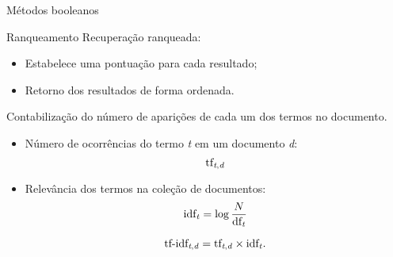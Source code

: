 \documentclass[%
  10pt,%
  aspectratio = 169,%
  compress,%
  t,%
]{beamer}%
\begin{document}
    \begin{frame}[fragile = singleslide]{}{Métodos booleanos}
        
    \end{frame}
    
    \begin{frame}[fragile = singleslide]{}{Ranqueamento}
        Recuperação ranqueada:
        \begin{itemize}
            \item Estabelece uma pontuação para cada resultado;
            \item Retorno dos resultados de forma ordenada.
        \end{itemize}
    
        Contabilização do número de aparições de cada um dos termos no documento.
        \begin{itemize}
            \item Número de ocorrências do termo \textit{t} em um documento \textit{d}:
            \begin{equation}\label{eq:tf-td}
                \text{tf}_{\text{\textit{t},\textit{d}}}
            \end{equation}
            \item Relevância dos termos na coleção de documentos:
            \begin{equation}
                \label{eq:inverse-document-frequency}
                \text{idf}_{\text{\textit{t}}} = \log{\frac{N}{\text{df}_{\text{\textit{t}}}}}
            \end{equation}
            
            \begin{equation}
                \label{eq:tf-idf}
                \text{tf-idf}_{\text{\textit{t},\textit{d}}}  = \text{tf}_{\text{\textit{t},\textit{d}}} \times \text{idf}_{\text{\textit{t}}}.
            \end{equation}
        \end{itemize}
        
    \end{frame}
   
\end{document}
